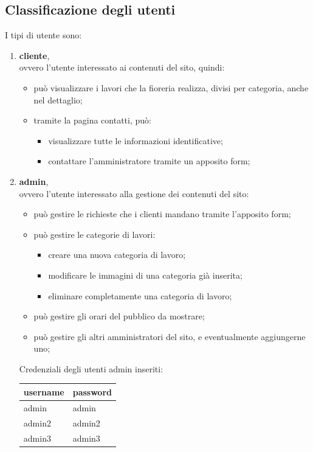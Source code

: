 \subsection{Classificazione degli utenti}
I tipi di utente sono:
\begin{enumerate}
\item \textbf{cliente}, \\ovvero l'utente interessato ai contenuti del sito, quindi:
\begin{itemize}
\item può visualizzare i lavori che la fioreria realizza, divisi per categoria, anche nel dettaglio;
\item tramite la pagina contatti, può: 
\begin{itemize}
\item visualizzare tutte le informazioni identificative;
\item contattare l'amministratore tramite un apposito form;
\end{itemize}  
\end{itemize}  
\item \textbf{admin}, \\ovvero l'utente interessato alla gestione dei contenuti del sito:
\begin{itemize}
\item può gestire le richieste che i clienti mandano tramite l'apposito form; 
\item può gestire le categorie di lavori:
\begin{itemize}
\item creare una nuova categoria di lavoro;
\item modificare le immagini di una categoria già inserita;
\item eliminare completamente una categoria di lavoro;
\end{itemize} 
\item può gestire gli orari del pubblico da mostrare;
\item può gestire gli altri amministratori del sito, e eventualmente aggiungerne uno;
\end{itemize}
Credenziali degli utenti admin inseriti:
\begin{center}
\begin{tabular}{|p{}|p{}|}
\hline
username          & password        \\
\hline
admin           & admin     \\
admin2         & admin2     \\
admin3         & admin3     \\
\hline
\end{tabular}
\end{center}
\end{enumerate}

